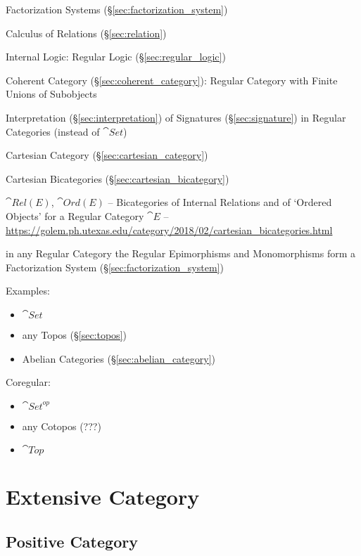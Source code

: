 \fist Factorization Systems (\S\ref{sec:factorization_system})

Calculus of Relations (\S\ref{sec:relation})

Internal Logic: Regular Logic (\S\ref{sec:regular_logic})

Coherent Category (\S\ref{sec:coherent_category}): Regular Category
with Finite Unions of Subobjects

Interpretation (\S\ref{sec:interpretation}) of Signatures
(\S\ref{sec:signature}) in Regular Categories (instead of $\cat{Set}$)

Cartesian Category (\S\ref{sec:cartesian_category})

Cartesian Bicategories (\S\ref{sec:cartesian_bicategory})

$\cat{Rel(E)}$, $\cat{Ord(E)}$ -- Bicategories of Internal Relations and of
`Ordered Objects' for a Regular Category $\cat{E}$
--\url{https://golem.ph.utexas.edu/category/2018/02/cartesian_bicategories.html}

in any Regular Category the Regular Epimorphisms and Monomorphisms
form a Factorization System (\S\ref{sec:factorization_system})

Examples:

\begin{itemize}
  \item $\cat{Set}$
  \item any Topos (\S\ref{sec:topos})
  \item Abelian Categories (\S\ref{sec:abelian_category})
\end{itemize}

Coregular:

\begin{itemize}
  \item $\cat{Set}^{op}$
  \item any Cotopos (???)
  \item $\cat{Top}$
\end{itemize}



\section{Extensive Category}\label{sec:extensive_category}

\subsection{Positive Category}\label{sec:positive_category}


